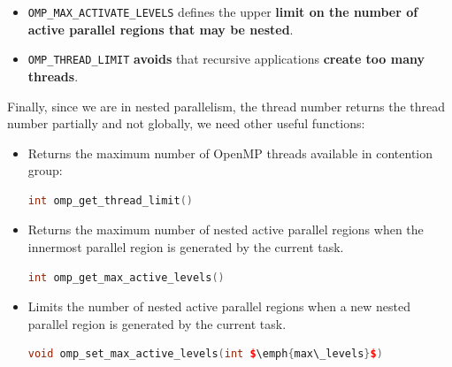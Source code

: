\begin{itemize}
    \item \texttt{OMP\_MAX\_ACTIVATE\_LEVELS} defines the upper \textbf{limit on the number of active parallel regions that may be nested}.

    \item \texttt{OMP\_THREAD\_LIMIT} \textbf{avoids} that recursive applications \textbf{create too many threads}.
\end{itemize}
Finally, since we are in nested parallelism, the thread number returns the thread number partially and not globally, we need other useful functions:
\begin{itemize}
    \item Returns the maximum number of OpenMP threads available in contention group:
    \begin{openmpbox}
        \begin{lstlisting}[language=C++]
int omp_get_thread_limit()\end{lstlisting}
    \end{openmpbox}

    \item Returns the maximum number of nested active parallel regions when the innermost parallel region is generated by the current task.
    \begin{openmpbox}
        \begin{lstlisting}[language=C++]
int omp_get_max_active_levels()\end{lstlisting}
    \end{openmpbox}
    
    \item Limits the number of nested active parallel regions when a new nested parallel region is generated by the current task.
    \begin{openmpbox}
        \begin{lstlisting}[language=C++]
void omp_set_max_active_levels(int $\emph{max\_levels}$)\end{lstlisting}
    \end{openmpbox}
    

\end{itemize}
